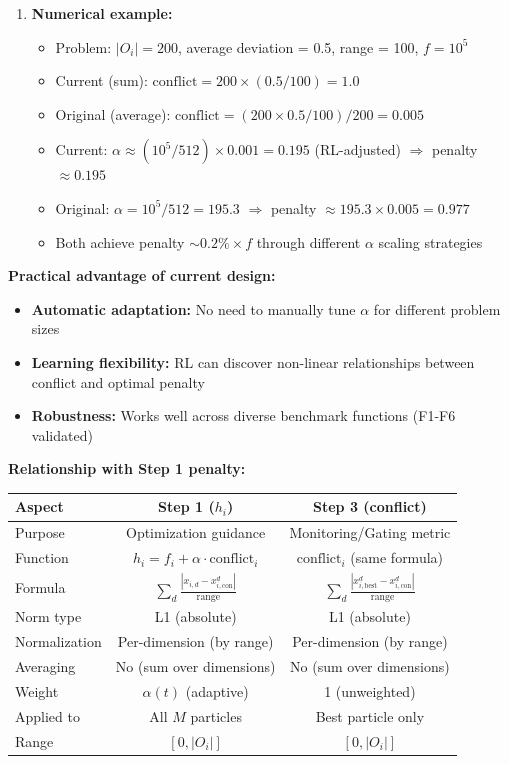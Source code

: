 \documentclass[11pt,a4paper]{article}
\begin{document}
\begin{enumerate}
    \item \textbf{Numerical example:}
    \begin{itemize}
        \item Problem: $|O_i| = 200$, average deviation = 0.5, range = 100, $f = 10^5$
        \item Current (sum): $\text{conflict} = 200 \times (0.5/100) = 1.0$
        \item Original (average): $\text{conflict} = (200 \times 0.5/100) / 200 = 0.005$
        \item Current: $\alpha \approx (10^5 / 512) \times 0.001 = 0.195$ (RL-adjusted) $\Rightarrow$ penalty $\approx 0.195$
        \item Original: $\alpha = 10^5 / 512 = 195.3$ $\Rightarrow$ penalty $\approx 195.3 \times 0.005 = 0.977$
        \item Both achieve penalty $\sim 0.2\% \times f$ through different $\alpha$ scaling strategies
    \end{itemize}
\end{enumerate}

\textbf{Practical advantage of current design:}
\begin{itemize}
    \item \textbf{Automatic adaptation:} No need to manually tune $\alpha$ for different problem sizes
    \item \textbf{Learning flexibility:} RL can discover non-linear relationships between conflict and optimal penalty
    \item \textbf{Robustness:} Works well across diverse benchmark functions (F1-F6 validated)
\end{itemize}

\textbf{Relationship with Step 1 penalty:}
\begin{center}
\begin{tabular}{|l|c|c|}
\hline
\textbf{Aspect} & \textbf{Step 1 ($h_i$)} & \textbf{Step 3 (conflict)} \\
\hline
Purpose & Optimization guidance & Monitoring/Gating metric \\
Function & $h_i = f_i + \alpha \cdot \text{conflict}_i$ & $\text{conflict}_i$ (same formula) \\
Formula & $\sum_d \frac{|x_{i,d} - x_{i,\text{con}}^d|}{\text{range}}$ & $\sum_d \frac{|x_{i,\text{best}}^d - x_{i,\text{con}}^d|}{\text{range}}$ \\
Norm type & L1 (absolute) & L1 (absolute) \\
Normalization & Per-dimension (by range) & Per-dimension (by range) \\
Averaging & No (sum over dimensions) & No (sum over dimensions) \\
Weight & $\alpha(t)$ (adaptive) & 1 (unweighted) \\
Applied to & All $M$ particles & Best particle only \\
Range & $[0, |O_i|]$ & $[0, |O_i|]$ \\
\hline
\end{tabular}
\end{center}
\end{document}
